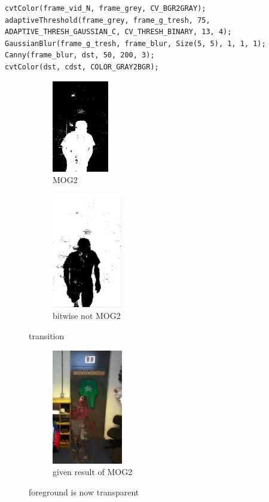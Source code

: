 \documentclass{article}
\begin{document}
\begin{lstlisting}
cvtColor(frame_vid_N, frame_grey, CV_BGR2GRAY);
adaptiveThreshold(frame_grey, frame_g_tresh, 75, ADAPTIVE_THRESH_GAUSSIAN_C, CV_THRESH_BINARY, 13, 4);
GaussianBlur(frame_g_tresh, frame_blur, Size(5, 5), 1, 1, 1);
Canny(frame_blur, dst, 50, 200, 3);
cvtColor(dst, cdst, COLOR_GRAY2BGR);

\end{lstlisting}



\begin{figure}[H]
\begin{subfigure}{0.5\textwidth}
\includegraphics[width=2cm\linewidth, height=4cm]{door_mask.PNG} 
\caption{MOG2}
\label{fig:subim1}
\end{subfigure}
\begin{subfigure}{0.5\textwidth}

\includegraphics[width=0.5\linewidth, height=5cm]{door_neg_mask.PNG}
\caption{bitwise not MOG2 }
\label{fig:subim2}
\end{subfigure}
\caption{transition}
\label{fig:image2}
\end{figure}

\begin{figure}[H]
\center
\begin{subfigure}{0.5\textwidth}
\includegraphics[width=0.5\linewidth, height=5cm]{door_back_proj.PNG} 
\caption{given result of MOG2}
\label{fig:subim1}
\end{subfigure}
\caption{foreground is now transparent}
\label{fig:image2}
\end{figure}
\end{document}
